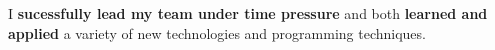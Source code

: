 \documentclass[]{jonas-cv}
\begin{document}
\begin{minipage}[t]{0.63\textwidth}
\begin{tightemize}
   \item[\faicon{angle-double-right}] I \textbf{sucessfully lead my team under time pressure} and both \textbf{learned and applied} a variety of new technologies and programming techniques.
\end{tightemize}



\end{minipage}
\end{document}
